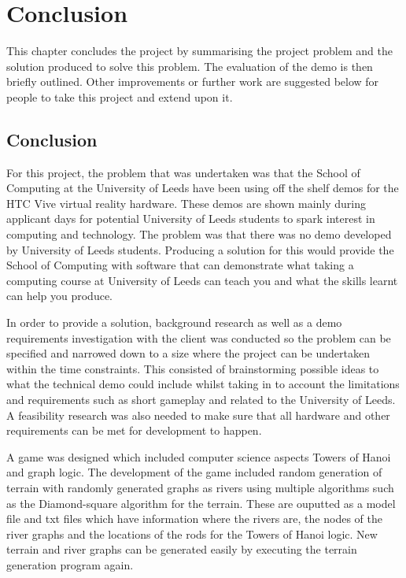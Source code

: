 \chapter{Conclusion}
\label{chapter8}

This chapter concludes the project by summarising the project problem and the solution produced to solve this problem. The evaluation of the demo is then briefly outlined. Other improvements or further work are suggested below for people to take this project and extend upon it.

\section{Conclusion}
For this project, the problem that was undertaken was that the School of Computing at the University of Leeds have been using off the shelf demos for the HTC Vive virtual reality hardware. These demos are shown mainly during applicant days for potential University of Leeds students to spark interest in computing and technology. The problem was that there was no demo developed by University of Leeds students. Producing a solution for this would provide the School of Computing with software that can demonstrate what taking a computing course at University of Leeds can teach you and what the skills learnt can help you produce.
\newline
\par
In order to provide a solution, background research as well as a demo requirements investigation with the client was conducted so the problem can be specified and narrowed down to a size where the project can be undertaken within the time constraints. This consisted of brainstorming possible ideas to what the technical demo could include whilst taking in to account the limitations and requirements such as short gameplay and related to the University of Leeds. A feasibility research was also needed to make sure that all hardware and other requirements can be met for development to happen.
\newline
\par
A game was designed which included computer science aspects Towers of Hanoi and graph logic. The development of the game included random generation of terrain with randomly generated graphs as rivers using multiple algorithms such as the Diamond-square algorithm for the terrain. These are ouputted as a model file and txt files which have information where the rivers are, the nodes of the river graphs and the locations of the rods for the Towers of Hanoi logic. New terrain and river graphs can be generated easily by executing the terrain generation program again.
